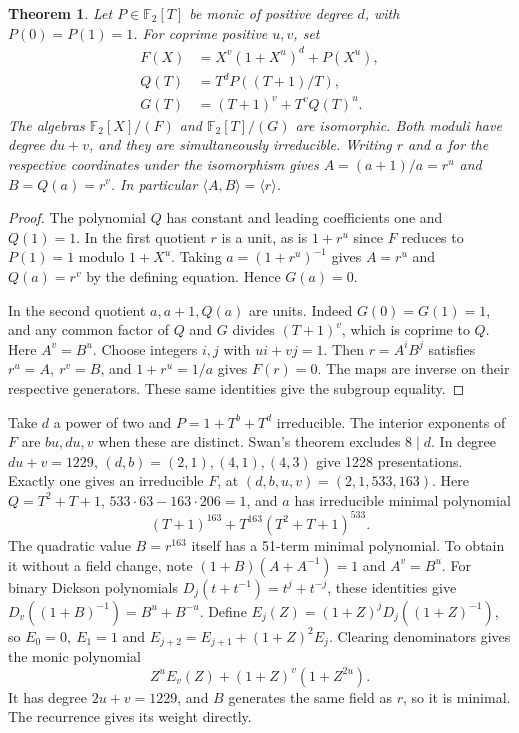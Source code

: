 \documentclass[11pt]{article}
\newtheorem{theorem}{Theorem}
\newcommand{\F}{\mathbb F_2}
\begin{document}
\begin{theorem}\label{thm:sparse-coordinate-transfer}
Let \(P\in\F[T]\) be monic of positive degree \(d\), with \(P(0)=P(1)=1\).
For coprime positive \(u,v\), set
\[
 \begin{split}
 F(X)&=X^v(1+X^u)^d+P(X^u),\\
 Q(T)&=T^dP((T+1)/T),\\
 G(T)&=(T+1)^v+T^v Q(T)^u .
 \end{split}
\]
The algebras \(\F[X]/(F)\) and \(\F[T]/(G)\) are isomorphic. Both
moduli have degree \(du+v\), and they are simultaneously irreducible.
Writing \(r\) and \(a\) for the respective coordinates under the
isomorphism gives \(A=(a+1)/a=r^u\) and \(B=Q(a)=r^v\).
In particular \(\langle A,B\rangle=\langle r\rangle\).
\end{theorem}
\begin{proof}
The polynomial \(Q\) has constant and leading coefficients one and
\(Q(1)=1\). In the first quotient \(r\) is a unit, as is \(1+r^u\)
since \(F\) reduces to \(P(1)=1\) modulo \(1+X^u\).
Taking \(a=(1+r^u)^{-1}\) gives \(A=r^u\) and \(Q(a)=r^v\) by the
defining equation. Hence \(G(a)=0\).

In the second quotient \(a,a+1,Q(a)\) are units. Indeed
\(G(0)=G(1)=1\), and any common factor of \(Q\) and \(G\) divides
\((T+1)^v\), which is coprime to \(Q\). Here \(A^v=B^u\).
Choose integers \(i,j\) with \(ui+vj=1\). Then \(r=A^iB^j\)
satisfies \(r^u=A,\ r^v=B\), and \(1+r^u=1/a\) gives \(F(r)=0\).
The maps are inverse on their respective generators. These same
identities give the subgroup equality.
\end{proof}

Take \(d\) a power of two and \(P=1+T^b+T^d\) irreducible. The
interior exponents of \(F\) are \(bu,du,v\) when these are distinct.
Swan's theorem excludes \(8\mid d\). In degree \(du+v=1229\),
\((d,b)=(2,1),(4,1),(4,3)\) give 1228 presentations. Exactly
one gives an irreducible \(F\), at \((d,b,u,v)=(2,1,533,163)\).
Here \(Q=T^2+T+1\), \(533\cdot63-163\cdot206=1\), and \(a\)
has irreducible minimal polynomial
\[
 (T+1)^{163}+T^{163}(T^2+T+1)^{533}.
\]
The quadratic value \(B=r^{163}\) itself has a 51-term minimal
polynomial. To obtain it without a field change, note
\((1+B)(A+A^{-1})=1\) and \(A^v=B^u\). For binary Dickson polynomials
\(D_j(t+t^{-1})=t^j+t^{-j}\), these identities give
\(D_v((1+B)^{-1})=B^u+B^{-u}\). Define
\(E_j(Z)=(1+Z)^jD_j((1+Z)^{-1})\), so \(E_0=0,\ E_1=1\) and
\(E_{j+2}=E_{j+1}+(1+Z)^2E_j\). Clearing denominators gives the
monic polynomial
\[
 Z^u E_v(Z)+(1+Z)^v(1+Z^{2u}).
\]
It has degree \(2u+v=1229\), and \(B\) generates the same field as
\(r\), so it is minimal. The recurrence gives its weight directly.
\end{document}
